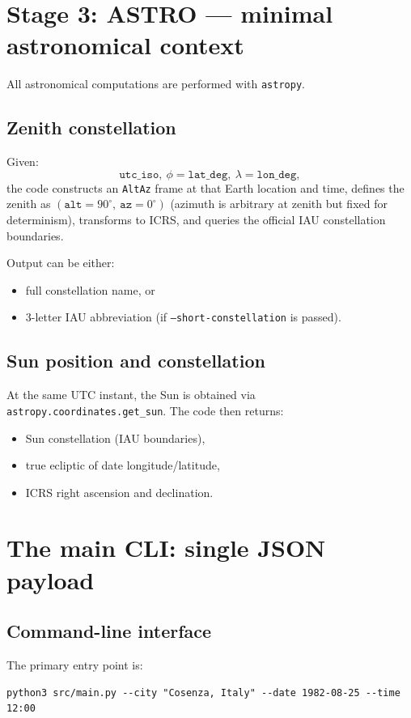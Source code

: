 \documentclass[11pt,a4paper]{article}
\begin{document}
\section{Stage 3: ASTRO --- minimal astronomical context}
All astronomical computations are performed with \texttt{astropy}.

\subsection{Zenith constellation}
Given:
\[
\texttt{utc\_iso},\ \phi=\texttt{lat\_deg},\ \lambda=\texttt{lon\_deg},
\]
the code constructs an \texttt{AltAz} frame at that Earth location and time, defines the zenith
as $(\texttt{alt}=90^\circ,\ \texttt{az}=0^\circ)$ (azimuth is arbitrary at zenith but fixed for determinism),
transforms to ICRS, and queries the official IAU constellation boundaries.

Output can be either:
\begin{itemize}
  \item full constellation name, or
  \item 3-letter IAU abbreviation (if \texttt{--short-constellation} is passed).
\end{itemize}

\subsection{Sun position and constellation}
At the same UTC instant, the Sun is obtained via \texttt{astropy.coordinates.get\_sun}.
The code then returns:
\begin{itemize}
  \item Sun constellation (IAU boundaries),
  \item true ecliptic of date longitude/latitude,
  \item ICRS right ascension and declination.
\end{itemize}

\section{The main CLI: single JSON payload}
\subsection{Command-line interface}
The primary entry point is:
\begin{lstlisting}[style=bash]
python3 src/main.py --city "Cosenza, Italy" --date 1982-08-25 --time 12:00
\end{lstlisting}
\end{document}
